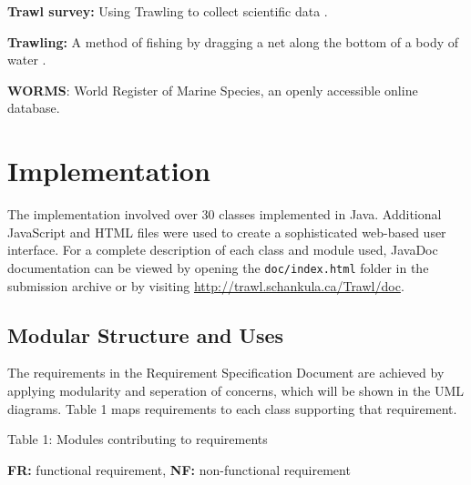 \documentclass{article}
\begin{document}
\noindent\textbf{Trawl survey:} Using Trawling to collect scientific data \citep{walsh1997efficiency}.

\noindent\textbf{Trawling:} A method of fishing by dragging a net along the bottom of a body of water \citep{walsh1997efficiency}.

\noindent\textbf{WORMS}: World Register of Marine Species, an openly accessible online database.

\section{Implementation}
The implementation involved over 30 classes implemented in Java. Additional JavaScript and HTML files were used to create a sophisticated web-based user interface. For a complete description of each class and module used, JavaDoc documentation can be viewed by opening the \texttt{doc/index.html} folder in the submission archive or by visiting \url{http://trawl.schankula.ca/Trawl/doc}.


\subsection {Modular Structure and Uses}
The requirements in the Requirement Specification Document are achieved by applying modularity and seperation of concerns, which will be shown in the UML diagrams. Table 1 maps requirements to each class supporting that requirement.\\

\newpage
\begin{center}
Table 1: Modules contributing to requirements

\textbf{FR:} functional requirement, \textbf{NF:} non-functional requirement\\\end{center}
\end{document}
